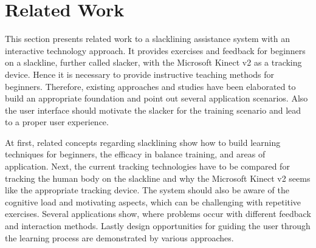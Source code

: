 \chapter{Related Work}\label{2_relatedWork}

This section presents related work to a slacklining assistance system with an interactive technology approach.
It provides exercises and feedback for beginners on a slackline, further called slacker, with the Microsoft Kinect v2 as a tracking device.
Hence it is necessary to provide instructive teaching methods for beginners.
Therefore, existing approaches and studies have been elaborated to build an appropriate foundation and point out several application scenarios.
Also the user interface should motivate the slacker for the training scenario and lead to a proper user experience.

At first, related concepts regarding slacklining show how to build learning techniques for beginners, the efficacy in balance training, and areas of application.
Next, the current tracking technologies have to be compared for tracking the human body on the slackline and why the Microsoft Kinect v2 seems like the appropriate tracking device.
The system should also be aware of the cognitive load and motivating aspects, which can be challenging with repetitive exercises.
Several applications show, where problems occur with different feedback and interaction methods.
Lastly design opportunities for guiding the user through the learning process are demonstrated by various approaches.

\label{2_1_slacklineTraining}

\label{2_2_interactiveTechnology}

\label{2_3_feedbackMethods}

\label{2_4_uiDesign}


\newpage
